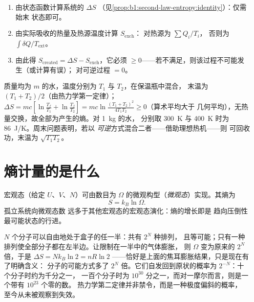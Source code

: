 \begin{method}[列写熵平衡]\label{met:b1:second-law-entropy:method}
\begin{enumerate}
  \item 由状态函数计算系统的 $\Delta S$
        （见\cref{prop:b1:second-law-entropy:identity}）：仅需始末
        状态即可。
  \item 由实际吸收的热量及热源温度计算 $S_{\mathrm{exch}}$：
        对热源为 $\sum Q_i/T_i$，
        否则为 $\int\delta Q/T_{\mathrm{ext}}$。
  \item 由此得 $S_{\mathrm{created}} = \Delta S - S_{\mathrm{exch}}$，它必须
        $\geq 0$——若不满足，则该过程不可能发生（或计算有误）；
        对可逆过程 $= 0$。
\end{enumerate}
\end{method}

\begin{example}[冷热混合]\label{ex:b1:second-law-entropy:mixing}
质量均为 $m$ 的水，温度分别为 $T_1$ 与 $T_2$，在保温瓶中混合，
末温为 $(T_1 + T_2)/2$（由热力学第一定律）；$\Delta S = mc[\ln\frac{T_f}{T_1} + \ln\frac{T_f}{T_2}]
= mc\ln\frac{(T_1 + T_2)^2}{4T_1T_2} \geq 0$（算术平均大于
几何平均），无热量交换，故全部为产生的熵。对 \qty{1}{kg} 的水，
分别取 \qty{300}{K} 与 \qty{400}{K} 时为 \qty{86}{J/K}。周末问题表明，若以
\emph{可逆}方式混合二者——借助理想热机——则
可回收功，末温为 $\sqrt{T_1T_2}$。
\end{example}

\section{熵计量的是什么}

\begin{proposition}[玻尔兹曼公式]\label{prop:b1:second-law-entropy:boltzmann}
宏观态（给定 $U$、$V$、$N$）可由数目为
$\Omega$ 的微观构型（\emph{微观态}）实现。其熵为
\[
S = k_B\ln\Omega .
\]
孤立系统向微观态数
远多于其他宏观态的宏观态演化：熵的增长即是
趋向压倒性最可能状态的行进。
\end{proposition}
\admitted

\begin{example}[为什么气体不会自动回去]\label{ex:b1:second-law-entropy:count}
$N$ 个分子可以自由地处于盒子的任一半：共有 $2^N$ 种排列，
且等可能；只有一种排列使全部分子都在左半边。让限制在一半中的气体膨胀，
则 $\Omega$ 变为原来的 $2^N$ 倍，于是 $\Delta S =
Nk_B\ln2 = nR\ln2$ ——恰好是上面的焦耳膨胀结果，只是现在有了明确含义：
分子的可能方式多了 $2^N$ 倍。它们自发回到原状的概率为
$2^{-N}$：十个分子时约为千分之一，
一百个分子时为 $10^{30}$ 分之一，而对一摩尔而言，则是一个带有 $10^{23}$ 个零的数。
热力学第二定律并非禁令，而是一种极度偏斜的概率，
至今从未被观察到失效。
\end{example}

